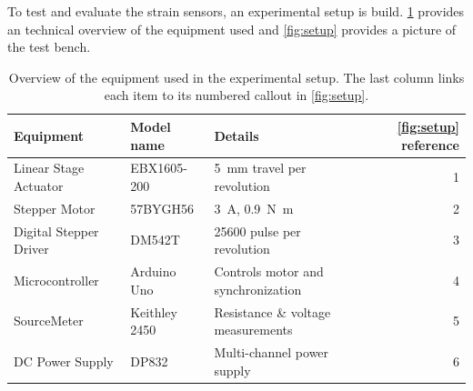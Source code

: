 To test and evaluate the strain sensors, an experimental setup is build. \cref{tab:setup} provides an technical overview of the equipment used and \cref{fig:setup} provides a picture of the test bench. 

\begin{table}[!b]
\centering
\caption{Overview of the equipment used in the experimental setup. The last column links each item to its numbered callout in \cref{fig:setup}.}
\label{tab:setup}
\small
\setlength{\tabcolsep}{6pt}
\begin{tabularx}{\textwidth}{@{}l l X r@{}}
\toprule
Equipment & Model name & Details & \cref{fig:setup} reference\\
\midrule
Linear Stage Actuator & EBX1605-200 & \SI{5}{\milli\meter} travel per revolution & 1 \\
Stepper Motor & 57BYGH56 & \SI{3}{\ampere}, \SI{0.9}{\newton\meter} & 2 \\
Digital Stepper Driver & DM542T & 25600 pulse per revolution & 3 \\
Microcontroller & Arduino Uno & Controls motor and synchronization & 4 \\
SourceMeter & Keithley 2450 & Resistance \& voltage measurements & 5 \\
DC Power Supply & DP832 & Multi-channel power supply & 6 \\
\bottomrule
\end{tabularx}
\end{table}

